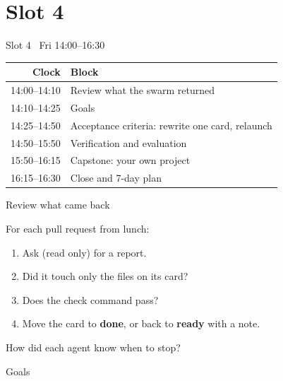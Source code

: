 
\section{Slot 4}

\begin{frame}{Slot 4 \textperiodcentered\ Fri 14:00--16:30}
  \begin{center}
    \begin{tabular}{@{}rl@{}}
      \toprule
      \textbf{Clock} & \textbf{Block} \\
      \midrule
      14:00--14:10 & Review what the swarm returned \\
      14:10--14:25 & Goals \\
      14:25--14:50 & Acceptance criteria: rewrite one card, relaunch \\
      14:50--15:50 & Verification and evaluation \\
      15:50--16:15 & Capstone: your own project \\
      16:15--16:30 & Close and 7-day plan \\
      \bottomrule
    \end{tabular}
  \end{center}
\end{frame}

\begin{frame}{Review what came back}
  \par\vspace{0.3em}
  For each pull request from lunch:
  \begin{enumerate}
    \item Ask  (read only) for a report.
    \item Did it touch only the files on its card?
    \item Does the check command pass?
    \item Move the card to \textbf{done}, or back to \textbf{ready} with a note.
  \end{enumerate}
  \vspace{0.4em}
  {\large How did each agent know when to stop?}
\end{frame}

\begin{frame}{Goals}
\end{frame}

